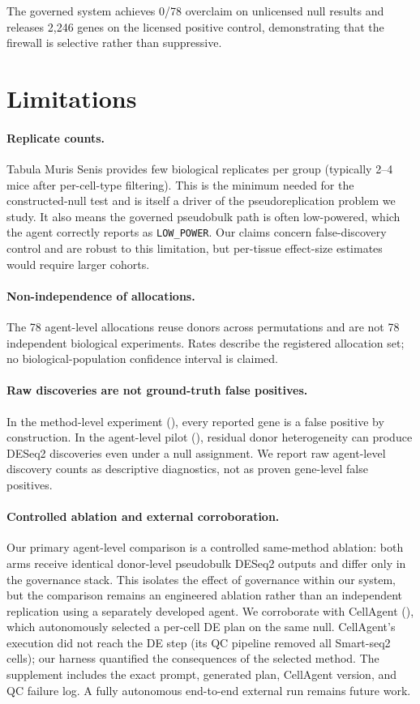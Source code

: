 \documentclass[pmlr,twocolumn,10pt]{jmlr}
\begin{document}
The governed system achieves 0/78 overclaim on unlicensed null results and
releases 2{,}246 genes on the licensed positive control, demonstrating that
the firewall is selective rather than suppressive.

\section{Limitations}

\paragraph{Replicate counts.} Tabula Muris Senis provides few biological
replicates per group (typically 2--4 mice after per-cell-type filtering). This
is the minimum needed for the constructed-null test and is itself a driver of the
pseudoreplication problem we study. It also means the governed pseudobulk path
is often low-powered, which the agent correctly reports as \texttt{LOW\_POWER}.
Our claims concern false-discovery control and are robust to this limitation,
but per-tissue effect-size estimates would require larger cohorts.

\paragraph{Non-independence of allocations.} The 78 agent-level allocations
reuse donors across permutations and are not 78 independent biological
experiments. Rates describe the registered allocation set; no
biological-population confidence interval is claimed.

\paragraph{Raw discoveries are not ground-truth false positives.} In the
method-level experiment (), every reported gene is a false
positive by construction. In the agent-level pilot (),
residual donor heterogeneity can produce DESeq2 discoveries even under a null
assignment. We report raw agent-level discovery counts as descriptive
diagnostics, not as proven gene-level false positives.

\paragraph{Controlled ablation and external corroboration.}
Our primary agent-level comparison is a controlled same-method ablation:
both arms receive identical donor-level pseudobulk DESeq2 outputs and differ
only in the governance stack. This isolates the effect of governance within
our system, but the comparison remains an engineered ablation rather than an
independent replication using a separately developed agent.
We corroborate with CellAgent (), which
autonomously selected a per-cell DE plan on the same null. CellAgent's
execution did not reach the DE step (its QC pipeline removed all Smart-seq2
cells); our harness quantified the consequences of the selected method.
The supplement includes the exact prompt, generated plan, CellAgent version,
and QC failure log. A fully autonomous end-to-end external run remains future
work.
\end{document}
